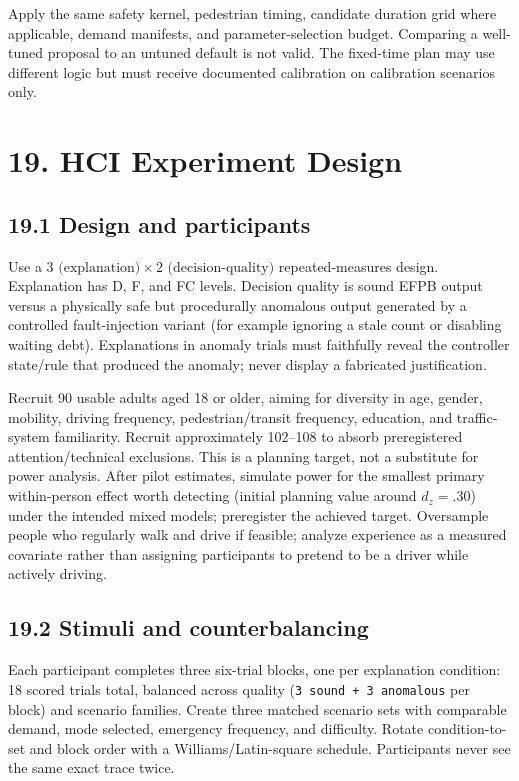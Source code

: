 \documentclass[
  english,
  11pt,
  a4paper,
]{article}
\begin{document}
Apply the same safety kernel, pedestrian timing, candidate duration grid
where applicable, demand manifests, and parameter-selection budget.
Comparing a well-tuned proposal to an untuned default is not valid. The
fixed-time plan may use different logic but must receive documented
calibration on calibration scenarios only.

\section{19. HCI Experiment Design}\label{hci-experiment-design}

\subsection{19.1 Design and participants}\label{design-and-participants}

Use a \(3\text{ (explanation)}\times2\text{ (decision-quality)}\)
repeated-measures
design. Explanation has D, F, and FC levels. Decision quality is sound
EFPB output versus a physically safe but procedurally anomalous output
generated by a controlled fault-injection variant (for example ignoring
a stale count or disabling waiting debt). Explanations in anomaly trials
must faithfully reveal the controller state/rule that produced the
anomaly; never display a fabricated justification.

Recruit 90 usable adults aged 18 or older, aiming for diversity in age,
gender, mobility, driving frequency, pedestrian/transit frequency,
education, and traffic-system familiarity. Recruit approximately
102--108 to absorb preregistered attention/technical exclusions. This is
a planning target, not a substitute for power analysis. After pilot
estimates, simulate power for the smallest primary within-person effect
worth detecting (initial planning value around \(d_z = .30\)) under the
intended mixed models; preregister the achieved target. Oversample
people who regularly walk and drive if feasible; analyze experience as a
measured covariate rather than assigning participants to pretend to be a
driver while actively driving.

\subsection{19.2 Stimuli and
counterbalancing}\label{stimuli-and-counterbalancing}

Each participant completes three six-trial blocks, one per explanation
condition: 18 scored trials total, balanced across quality
(\texttt{3\ sound\ +\ 3\ anomalous} per block) and scenario families.
Create three matched scenario sets with comparable demand, mode
selected, emergency frequency, and difficulty. Rotate condition-to-set
and block order with a Williams/Latin-square schedule. Participants
never see the same exact trace twice.
\end{document}
